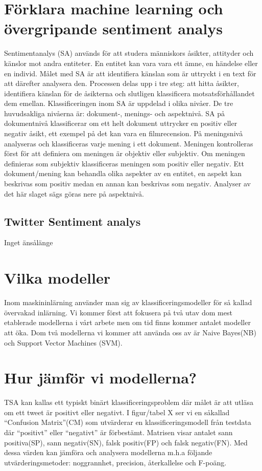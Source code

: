 \documentclass{kaumasters} %
\begin{document}
\section{Förklara machine learning och övergripande sentiment analys}
Sentimentanalys (SA) används för att studera människors åsikter, attityder och känslor mot andra entiteter. En entitet kan vara vara ett ämne,  en händelse eller en individ. Målet med SA är att identifiera känslan som är uttryckt i en text för att därefter analysera den. Processen delas upp i tre steg: att hitta åsikter, identifiera känslan för de åsikterna och slutligen klassificera motsatsförhållandet dem emellan. Klassificeringen inom SA är uppdelad i olika nivåer. 
De tre huvudsakliga nivåerna är: dokument-, menings- och aspektnivå. SA på dokumentnivå klassificerar om ett helt dokument uttrycker en positiv eller negativ åsikt, ett exempel på det kan vara en filmrecension. 
På meningsnivå analyseras och klassificeras varje mening i ett dokument. Meningen kontrolleras först för att definiera om meningen är objektiv eller subjektiv. Om meningen definieras som subjektiv klassificeras meningen som positiv eller negativ. 
Ett dokument/mening kan behandla olika aspekter av en entitet, en aspekt kan beskrivas som positiv medan en annan kan beskrivas som negativ. Analyser av det här slaget sägs göras nere på aspektnivå.
\subsection{Twitter Sentiment analys}
Inget änsålänge
\section{Vilka modeller}
Inom maskininlärning använder man sig av klassificeringsmodeller för så kallad övervakad inlärning. Vi kommer först att fokusera på två utav dom mest etablerade modellerna i vårt arbete men om tid finns kommer antalet modeller att öka. Dom två modellerna vi kommer att använda oss av är Naive Bayes(NB) och Support Vector Machines (SVM). 

\section{Hur jämför vi modellerna?}
TSA kan kallas ett typiskt binärt klassificeringsproblem där målet är att utläsa om ett tweet är positivt eller negativt. I figur/tabel X ser vi en såkallad “Confusion Matrix”(CM) som utvärderar en klassificeringsmodell från testdata där “positivt” eller “negativt” är förbestämt. Matrisen visar antalet sann positiva(SP), sann negativ(SN), falsk positiv(FP) och falsk negativ(FN). Med dessa värden kan jämföra och analysera modellerna m.h.a följande utvärderingsmetoder: noggrannhet, precision, återkallelse och F-poäng. 
\end{document}
